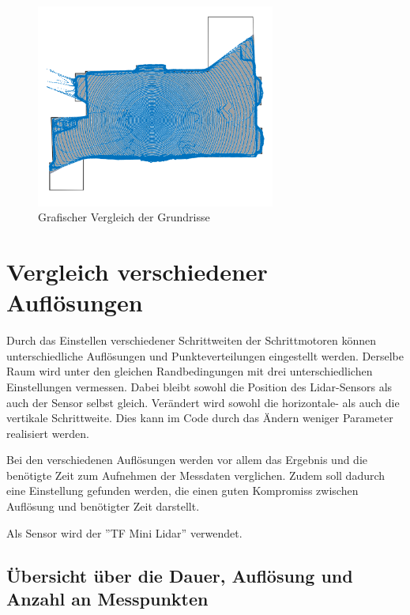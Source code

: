 \begin{figure}[H]
	\centering
	\includegraphics[width=0.7\textwidth]{images/Validierung/uebereinander}
	\caption{Grafischer Vergleich der Grundrisse}
	\label{uebereinander}
\end{figure}




\section{Vergleich verschiedener Auflösungen}

Durch das Einstellen verschiedener Schrittweiten der Schrittmotoren können unterschiedliche Auflösungen und Punkteverteilungen eingestellt werden. Derselbe Raum wird unter den gleichen Randbedingungen mit drei unterschiedlichen Einstellungen vermessen. Dabei bleibt sowohl die Position des Lidar-Sensors als auch der Sensor selbst gleich. Verändert wird sowohl die horizontale- als auch die vertikale Schrittweite. Dies kann im Code durch das Ändern weniger Parameter realisiert werden.

Bei den verschiedenen Auflösungen werden vor allem das Ergebnis und die benötigte Zeit zum Aufnehmen der Messdaten verglichen. Zudem soll dadurch eine Einstellung gefunden werden, die einen guten Kompromiss zwischen Auflösung und benötigter Zeit darstellt. 

Als Sensor wird der ''TF Mini Lidar'' verwendet.


\subsection{Übersicht über die Dauer, Auflösung und Anzahl an Messpunkten}

